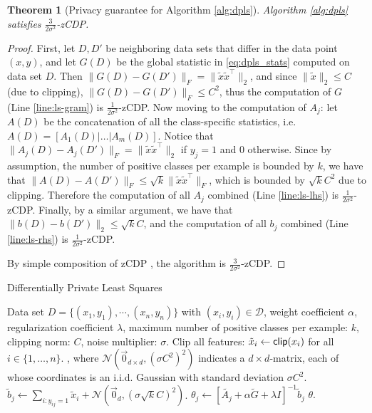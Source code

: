 \documentclass[letterpaper]{article} \usepackage{fullpage}
\def\cD{\mathcal{D}}
\def\calN{\mathcal{N}}
\newtheorem{thm}[lem]{Theorem}
\begin{document}
\begin{thm}[Privacy guarantee for Algorithm \ref{alg:dpls}]
Algorithm \ref{alg:dpls} satisfies $\frac{3}{2\sigma^2}$-zCDP.
\end{thm}
\begin{proof}
First, let $D, D'$ be neighboring data sets that differ in the data point $(x, y)$, and let $G(D)$ be the global statistic in \eqref{eq:dpls_stats} computed on data set $D$. Then $\|G(D) - G(D')\|_F = \|\tilde x \tilde x^\top\|_2$, and since $\|\tilde x\|_2 \leq C$ (due to clipping), $\|G(D) - G(D')\|_F \leq C^2$, thus the computation of $G$ (Line \ref{line:ls-gram}) is $\frac{1}{2\sigma^2}$-zCDP. Now moving to the computation of $A_j$: let $A(D)$ be the concatenation of all the class-specific statistics, i.e. $A(D) = [A_1(D) | \dots | A_m(D)]$. Notice that $\|A_j(D) - A_j(D')\|_F = \|\tilde x \tilde x^\top\|_2$ if $y_j = 1$ and $0$ otherwise. Since by assumption, the number of positive classes per example is bounded by $k$, we have that $\|A(D) - A(D')\|_F \leq \sqrt k\|\tilde x \tilde x^\top\|_F$, which is bounded by $\sqrt kC^2$ due to clipping. Therefore the computation of all $A_j$ combined (Line \ref{line:ls-lhs}) is $\frac{1}{2\sigma^2}$-zCDP. Finally, by a similar argument, we have that $\|b(D) - b(D')\|_2 \leq \sqrt kC$, and the computation of all $b_j$ combined (Line \ref{line:ls-rhs}) is $\frac{1}{2\sigma^2}$-zCDP.

By simple composition of zCDP \cite{bun2016concentrated}, the algorithm is $\frac{3}{2\sigma^2}$-zCDP.
\end{proof}

\begin{algorithm}[ht]
\caption{Differentially Private Least Squares}
\begin{algorithmic}[1]
\REQUIRE Data set $D=\{(x_1, y_1),\cdots,(x_n, y_n)\}$ with $(x_i, y_i)\in \cD$, weight coefficient $\alpha$, regularization coefficient $\lambda$, maximum number of positive classes per example: $k$, clipping norm: $C$, noise multiplier: $\sigma$.
\STATE Clip all features: $\tilde x_i\leftarrow {\sf clip}(x_i)$ for all $i\in\{1,\dots,n\}$.
{\STATE {$\tilde G \leftarrow \sum_{i = 1}^n \tilde x_i \tilde x_i^\top + \calN\left(\vec{0}_{d\times d},\left(\sigma C^2\right)^2\right)$}}, where $\calN\left(\vec{0}_{d \times d},(\sigma C^2)^2\right)$ indicates a $d\times d$-matrix, each of whose coordinates is an i.i.d. Gaussian with standard deviation $\sigma C^2$. \label{line:ls-gram}
{\STATE {$\tilde A_j \leftarrow \sum_{i: y_{ij} = 1} \tilde x_i \tilde x_i^\top + \calN\left(\vec{0}_{d\times d},\left(\sigma \sqrt k C^2\right)^2\right)$} \label{line:ls-lhs}}
\STATE $\tilde b_j \leftarrow \sum_{i: y_{ij} = 1} \tilde x_i +\calN\left(\vec{0}_{d},(\sigma \sqrt k C)^2\right)$. \label{line:ls-rhs}
{\STATE $\theta_{j} \leftarrow \left[\tilde{A_j} + \alpha \tilde G + \lambda I\right]^{-1} \tilde b_j$\label{line:ls-solution}}
\ENDFOR{}
{ $\theta$\label{eq:lastDPLS}.}
\end{algorithmic}
\label{alg:dpls}
\end{algorithm}
\end{document}
